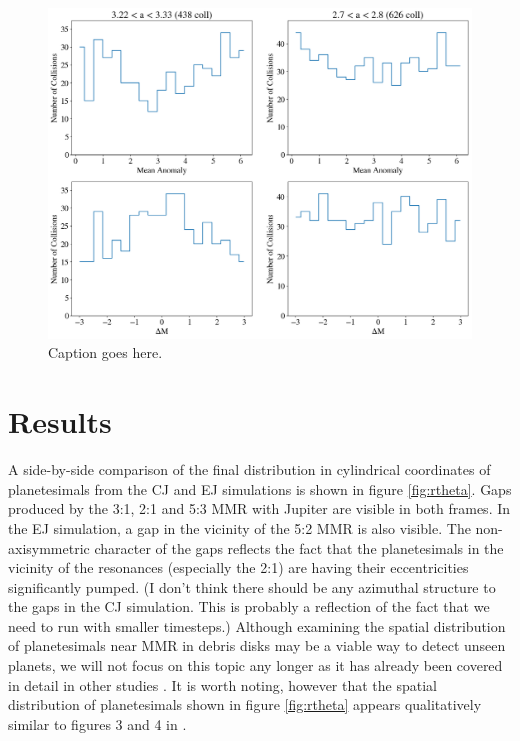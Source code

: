 \documentclass[twocolumn]{aastex63}
\begin{document}
\begin{figure}
    \includegraphics[width=\textwidth]{figures/m_hist.png}
    \caption{Caption goes here.\label{fig:coll_hist_r}}
\end{figure}

\section{Results} \label{sec:results}

A side-by-side comparison of the final distribution in cylindrical coordinates of planetesimals from the CJ and EJ simulations is shown in figure \ref{fig:rtheta}. Gaps produced by the 3:1, 2:1 and 5:3 MMR with Jupiter are visible in both frames. In the EJ simulation, a gap in the vicinity of the 5:2 MMR is also visible. The non-axisymmetric character of the gaps reflects the fact that the planetesimals in the vicinity of the resonances (especially the 2:1) are having their eccentricities significantly pumped. (I don't think there should be any azimuthal structure to the gaps in the CJ simulation. This is probably a reflection of the fact that we need to run with smaller timesteps.) Although examining the spatial distribution of planetesimals near MMR in debris disks may be a viable way to detect unseen planets, we will not focus on this topic any longer as it has already been covered in detail in other studies \citep{2016ApJ...818..159T, 2018ApJ...857....3T}. It is worth noting, however that the spatial distribution of planetesimals shown in figure \ref{fig:rtheta} appears qualitatively similar to figures 3 and 4 in \citep{2016ApJ...818..159T}.
\end{document}
